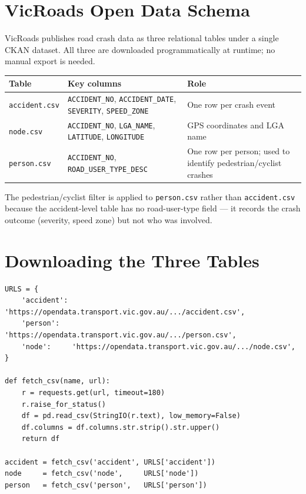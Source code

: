 \documentclass[11pt,a4paper,openany]{book}
\begin{document}
\section{VicRoads Open Data Schema}

VicRoads publishes road crash data as three relational tables under a single CKAN
dataset.  All three are downloaded programmatically at runtime; no manual export is needed.

\begin{center}
\begin{tabular}{lL{4cm}L{6cm}}
\toprule
Table & Key columns & Role \\
\midrule
\texttt{accident.csv} & \texttt{ACCIDENT\_NO}, \texttt{ACCIDENT\_DATE},
  \texttt{SEVERITY}, \texttt{SPEED\_ZONE} & One row per crash event \\
\texttt{node.csv} & \texttt{ACCIDENT\_NO}, \texttt{LGA\_NAME},
  \texttt{LATITUDE}, \texttt{LONGITUDE} & GPS coordinates and LGA name \\
\texttt{person.csv} & \texttt{ACCIDENT\_NO},
  \texttt{ROAD\_USER\_TYPE\_DESC} & One row per person; used to identify
  pedestrian/cyclist crashes \\
\bottomrule
\end{tabular}
\end{center}

The pedestrian/cyclist filter is applied to \texttt{person.csv} rather than
\texttt{accident.csv} because the accident-level table has no road-user-type field ---
it records the crash outcome (severity, speed zone) but not who was involved.

\section{Downloading the Three Tables}

\begin{lstlisting}[style=python, caption={fetch\_csv() and the three VicRoads URLs.}]
URLS = {
    'accident': 'https://opendata.transport.vic.gov.au/.../accident.csv',
    'person':   'https://opendata.transport.vic.gov.au/.../person.csv',
    'node':     'https://opendata.transport.vic.gov.au/.../node.csv',
}

def fetch_csv(name, url):
    r = requests.get(url, timeout=180)
    r.raise_for_status()
    df = pd.read_csv(StringIO(r.text), low_memory=False)
    df.columns = df.columns.str.strip().str.upper()
    return df

accident = fetch_csv('accident', URLS['accident'])
node     = fetch_csv('node',     URLS['node'])
person   = fetch_csv('person',   URLS['person'])
\end{lstlisting}
\end{document}
